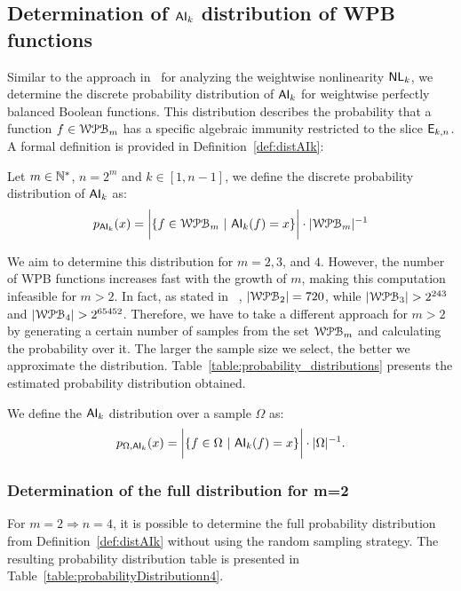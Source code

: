 \documentclass[11pt]{llncs}
\begin{document}
\FloatBarrier
\subsection{Determination of $\mathsf{AI}_{k}$ distribution of WPB functions}\label{subsec:AIkWPB}

Similar to the approach in~\cite{Latin:GinMea23} for analyzing the weightwise nonlinearity $\mathsf{NL}_{k}$, we determine the discrete probability distribution of $\mathsf{AI}_{k}$ for weightwise perfectly balanced Boolean functions. 
This distribution describes the probability that a function $f \in \mathcal{WPB}_{m}$ has a specific algebraic immunity restricted to the slice $\mathsf{E}_{k,n}$. 
A formal definition is provided in Definition~\ref{def:distAIk}:

\begin{definition}\label{def:distAIk}
    Let $m \in \mathbb{N}^*$, $n = 2^m$ and $k \in [1,n-1]$, we define the discrete probability distribution of $\mathsf{AI}_{k}$ as:
\[p_{\mathsf{AI}_{k}}(x) = \bigg|\{f\in \mathcal{WPB}_{m}\  |\  \mathsf{AI}_{k}(f) = x\}\bigg| \cdot |\mathcal{WPB}_{m}|^{-1}\]
\end{definition}

We aim to determine this distribution for $m = 2, 3$, and $4$. 
However, the number of WPB functions increases fast with the growth of $m$, making this computation infeasible for $m > 2$. In fact, as stated in ~\cite{Latin:GinMea23}, $|\mathcal{WPB}_{2}| = 720$, while $|\mathcal{WPB}_{3}| > 2^{243}$ and $|\mathcal{WPB}_{4}| > 2^{65452}$.
Therefore, we have to take a different approach for $m > 2$ by generating a certain number of samples from the set $\mathcal{WPB}_{m}$ and calculating the probability over it. The larger the sample size we select, the better we approximate the distribution. 
Table~\ref{table:probability_distributions} presents the estimated probability distribution obtained.

\begin{definition}
    We define the $\mathsf{AI}_{k}$ distribution over a sample $\Omega$ as:
\[
 p_{\Omega,\mathsf{AI}_{k} }(x) =  \bigg|\{f\in \Omega\ | \  \mathsf{AI}_{k}(f) = x\}\bigg| \cdot |\Omega|^{-1}.\]
\end{definition}


\subsubsection{Determination of the full distribution for \texorpdfstring{m=2}{m=2}}
For $m=2 \Rightarrow n = 4$, it is possible to determine the full probability distribution from Definition~\ref{def:distAIk} without using the random sampling strategy. 
The resulting probability distribution table is presented in Table~\ref{table:probabilityDistributionn4}. 
\end{document}
